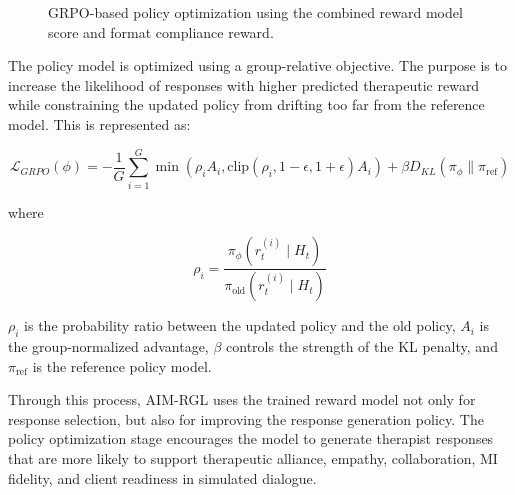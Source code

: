 \begin{figure}[htbp]
{
}
\caption{GRPO-based policy optimization using the combined reward model score and format compliance reward.}
\label{fig:grpo_policy_optimization}
\end{figure}

The policy model is optimized using a group-relative objective. The purpose is to increase the likelihood of responses with higher predicted therapeutic reward while constraining the updated policy from drifting too far from the reference model. This is represented as:

\[
\mathcal{L}_{GRPO}(\phi)
=
-\frac{1}{G}\sum_{i=1}^{G}
\min
\left(
\rho_i A_i,
\text{clip}(\rho_i, 1-\epsilon, 1+\epsilon)A_i
\right)
+
\beta D_{KL}(\pi_{\phi} \| \pi_{\text{ref}})
\]

where

\[
\rho_i = \frac{\pi_{\phi}(r_t^{(i)} \mid H_t)}
{\pi_{\text{old}}(r_t^{(i)} \mid H_t)}
\]

\(\rho_i\) is the probability ratio between the updated policy and the old policy, \(A_i\) is the group-normalized advantage, \(\beta\) controls the strength of the KL penalty, and \(\pi_{\text{ref}}\) is the reference policy model.

Through this process, AIM-RGL uses the trained reward model not only for response selection, but also for improving the response generation policy. The policy optimization stage encourages the model to generate therapist responses that are more likely to support therapeutic alliance, empathy, collaboration, MI fidelity, and client readiness in simulated dialogue.

